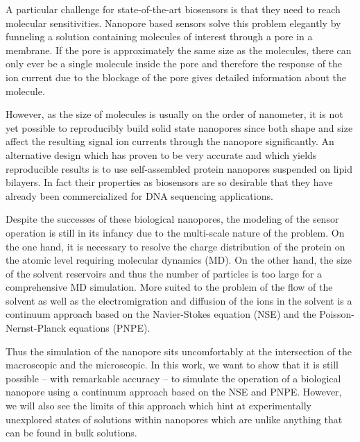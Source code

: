 \documentclass[journal=ancac3,manuscript=article,etalmode=truncate,maxauthors=0,layout=twocolumn]{achemso}
\begin{document}
A particular challenge for state-of-the-art biosensors is that they need to reach molecular sensitivities.  
Nanopore based sensors solve this problem elegantly by funneling a solution containing molecules of interest 
through a pore in a membrane. If the pore is approximately the same size as the molecules, there can only 
ever be a single molecule inside the pore and therefore the response of the ion current due to the blockage 
of the pore gives detailed information about the molecule.

However, as the size of molecules is usually on the order of nanometer, it is not yet possible to reproducibly
build solid state nanopores since both shape and size affect the resulting signal ion currents 
through the nanopore significantly. An alternative design which has proven to be very accurate and which 
yields reproducible results is to use self-assembled protein nanopores suspended on lipid 
bilayers\cite{Deamer-2016}.
In fact their properties as biosensors are so desirable that they have already been commercialized for DNA
sequencing applications.

Despite the successes of these biological nanopores, the modeling of the sensor operation is still in its 
infancy due to the multi-scale nature of the problem. On the one hand, it is necessary to resolve the charge 
distribution of the protein on the atomic level requiring molecular dynamics (MD).  On the other 
hand, the size of the solvent reservoirs and thus the number of particles is too large for a comprehensive MD 
simulation. More suited to the problem of the flow of the solvent as well as the electromigration and 
diffusion of the ions in the solvent is a continuum approach based on the Navier-Stokes equation (NSE) and 
the Poisson-Nernst-Planck equations (PNPE).

Thus the simulation of the nanopore sits uncomfortably at the intersection of the macroscopic and the
microscopic. In this work, we want to show that it is still possible -- with remarkable accuracy -- to 
simulate the operation of a biological nanopore using a continuum approach based on the NSE and PNPE. 
However, we will also see the limits of this approach which hint at experimentally unexplored states of
solutions within nanopores which are unlike anything that can be found in bulk solutions.
\end{document}
